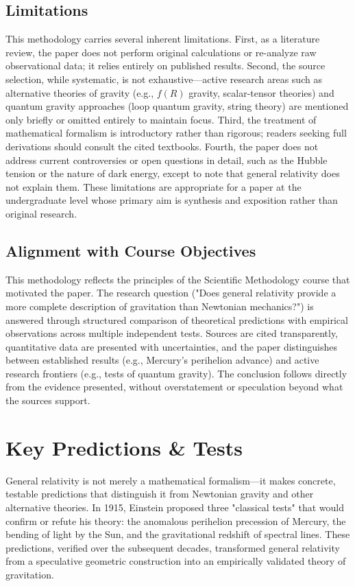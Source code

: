 \documentclass[12pt, a4paper]{article}
\begin{document}
	\subsection{Limitations}

	This methodology carries several inherent limitations. First, as a literature review, the paper does not perform original calculations or re-analyze raw observational data; it relies entirely on published results. Second, the source selection, while systematic, is not exhaustive—active research areas such as alternative theories of gravity (e.g., \(f(R)\) gravity, scalar-tensor theories) and quantum gravity approaches (loop quantum gravity, string theory) are mentioned only briefly or omitted entirely to maintain focus. Third, the treatment of mathematical formalism is introductory rather than rigorous; readers seeking full derivations should consult the cited textbooks. Fourth, the paper does not address current controversies or open questions in detail, such as the Hubble tension or the nature of dark energy, except to note that general relativity does not explain them. These limitations are appropriate for a paper at the undergraduate level whose primary aim is synthesis and exposition rather than original research.

	\subsection{Alignment with Course Objectives}

	This methodology reflects the principles of the Scientific Methodology course that motivated the paper. The research question ("Does general relativity provide a more complete description of gravitation than Newtonian mechanics?") is answered through structured comparison of theoretical predictions with empirical observations across multiple independent tests. Sources are cited transparently, quantitative data are presented with uncertainties, and the paper distinguishes between established results (e.g., Mercury's perihelion advance) and active research frontiers (e.g., tests of quantum gravity). The conclusion follows directly from the evidence presented, without overstatement or speculation beyond what the sources support.
	
	
	\section{Key Predictions \& Tests}
	General relativity is not merely a mathematical formalism—it makes concrete, testable predictions that distinguish it from Newtonian gravity and other alternative theories. In 1915, Einstein proposed three "classical tests" that would confirm or refute his theory: the anomalous perihelion precession of Mercury, the bending of light by the Sun, and the gravitational redshift of spectral lines. These predictions, verified over the subsequent decades, transformed general relativity from a speculative geometric construction into an empirically validated theory of gravitation.
	
\end{document}
